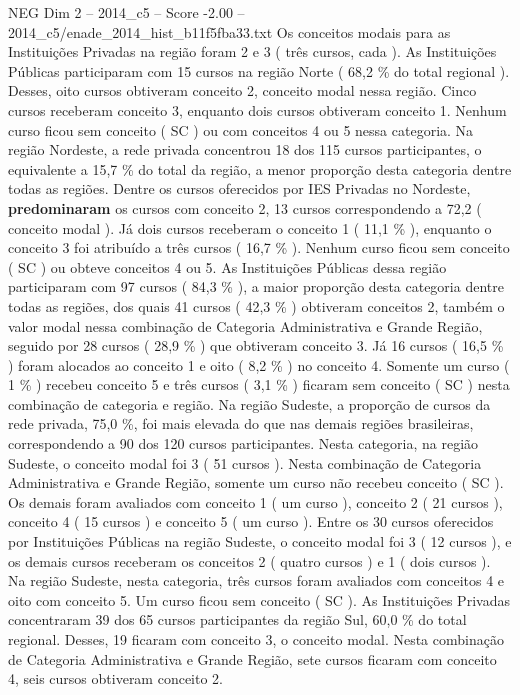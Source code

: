 \begin{textsample}{NEG Dim 2 – 2014\_c5 – Score -2.00 – 2014\_c5/enade\_2014\_hist\_b11f5fba33.txt}
Os conceitos modais para as Instituições Privadas na região foram 2 e 3 ( três cursos, cada ).
As Instituições Públicas participaram com 15 cursos na região Norte ( 68,2 \% do total regional ).
Desses, oito cursos obtiveram conceito 2, conceito modal nessa região.
Cinco cursos receberam conceito 3, enquanto dois cursos obtiveram conceito 1.
Nenhum curso ficou sem conceito ( SC ) ou com conceitos 4 ou 5 nessa categoria.
Na região Nordeste, a rede privada concentrou 18 dos 115 cursos participantes, o equivalente a 15,7 \% do total da região, a menor proporção desta categoria dentre todas as regiões.
Dentre os cursos oferecidos por IES Privadas no Nordeste, \textbf{predominaram} os cursos com conceito 2, 13 cursos correspondendo a 72,2 ( conceito modal ).
Já dois cursos receberam o conceito 1 ( 11,1 \% ), enquanto o conceito 3 foi atribuído a três cursos ( 16,7 \% ).
Nenhum curso ficou sem conceito ( SC ) ou obteve conceitos 4 ou 5.
As Instituições Públicas dessa região participaram com 97 cursos ( 84,3 \% ), a maior proporção desta categoria dentre todas as regiões, dos quais 41 cursos ( 42,3 \% ) obtiveram conceitos 2, também o valor modal nessa combinação de Categoria Administrativa e Grande Região, seguido por 28 cursos ( 28,9 \% ) que obtiveram conceito 3.
Já 16 cursos ( 16,5 \% ) foram alocados ao conceito 1 e oito ( 8,2 \% ) no conceito 4.
Somente um curso ( 1 \% ) recebeu conceito 5 e três cursos ( 3,1 \% ) ficaram sem conceito ( SC ) nesta combinação de categoria e região.
Na região Sudeste, a proporção de cursos da rede privada, 75,0 \%, foi mais elevada do que nas demais regiões brasileiras, correspondendo a 90 dos 120 cursos participantes.
Nesta categoria, na região Sudeste, o conceito modal foi 3 ( 51 cursos ).
Nesta combinação de Categoria Administrativa e Grande Região, somente um curso não recebeu conceito ( SC ).
Os demais foram avaliados com conceito 1 ( um curso ), conceito 2 ( 21 cursos ), conceito 4 ( 15 cursos ) e conceito 5 ( um curso ).
Entre os 30 cursos oferecidos por Instituições Públicas na região Sudeste, o conceito modal foi 3 ( 12 cursos ), e os demais cursos receberam os conceitos 2 ( quatro cursos ) e 1 ( dois cursos ).
Na região Sudeste, nesta categoria, três cursos foram avaliados com conceitos 4 e oito com conceito 5.
Um curso ficou sem conceito ( SC ).
As Instituições Privadas concentraram 39 dos 65 cursos participantes da região Sul, 60,0 \% do total regional.
Desses, 19 ficaram com conceito 3, o conceito modal.
Nesta combinação de Categoria Administrativa e Grande Região, sete cursos ficaram com conceito 4, seis cursos obtiveram conceito 2.

\end{textsample}
